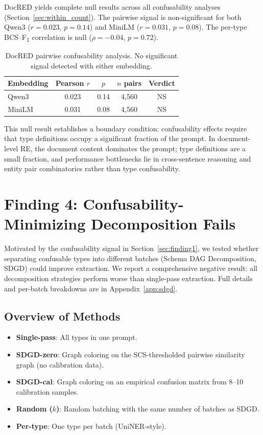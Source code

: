 \documentclass[11pt,a4paper]{article}
\newcommand{\fone}{F\textsubscript{1}}
\begin{document}
DocRED yields complete null results across all confusability analyses (Section~\ref{sec:within_count}).
The pairwise signal is non-significant for both Qwen3 ($r{=}0.023$, $p{=}0.14$) and MiniLM ($r{=}0.031$, $p{=}0.08$).
The per-type BCS--\fone{} correlation is null ($\rho{=}{-}0.04$, $p{=}0.72$).

\begin{table}[t]
\centering
\caption{DocRED pairwise confusability analysis. No significant signal detected with either embedding.}
\label{tab:docred_pairwise}
\small
\begin{tabular}{lcccc}
\toprule
\textbf{Embedding} & \textbf{Pearson $r$} & \textbf{$p$} & \textbf{$n$ pairs} & \textbf{Verdict} \\
\midrule
Qwen3  & 0.023 & 0.14 & 4,560 & NS \\
MiniLM & 0.031 & 0.08 & 4,560 & NS \\
\bottomrule
\end{tabular}
\end{table}

This null result establishes a boundary condition: confusability effects require that type definitions occupy a significant fraction of the prompt.
In document-level RE, the document content dominates the prompt; type definitions are a small fraction, and performance bottlenecks lie in cross-sentence reasoning and entity pair combinatorics rather than type confusability.


\section{Finding 4: Confusability-Minimizing Decomposition Fails}
\label{sec:finding4}

Motivated by the confusability signal in Section~\ref{sec:finding1}, we tested whether separating confusable types into different batches (Schema DAG Decomposition, SDGD) could improve extraction.
We report a comprehensive negative result: all decomposition strategies perform worse than single-pass extraction.
Full details and per-batch breakdowns are in Appendix~\ref{app:sdgd}.

\subsection{Overview of Methods}

\begin{itemize}[leftmargin=1.5em,itemsep=2pt]
\item \textbf{Single-pass}: All types in one prompt.
\item \textbf{SDGD-zero}: Graph coloring on the SCS-thresholded pairwise similarity graph (no calibration data).
\item \textbf{SDGD-cal}: Graph coloring on an empirical confusion matrix from 8--10 calibration samples.
\item \textbf{Random ($k$)}: Random batching with the same number of batches as SDGD.
\item \textbf{Per-type}: One type per batch (UniNER-style).
\end{itemize}
\end{document}
